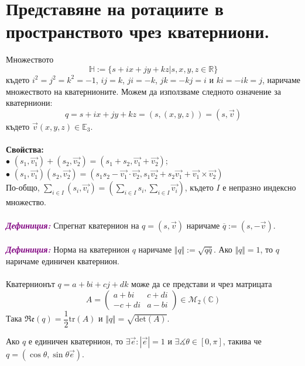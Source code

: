 \documentclass[12pt]{article}
\begin{document}
\par
\part{Представяне на ротациите в пространството чрез кватерниони.}
Множеството $$\mathbb{H}:=\{s+ix+jy+kz|s,x,y,z\in\mathbb{R}\}$$ където $i^2=j^2=k^2=-1$, $ij=k$, $ji=-k$, $jk=-kj=i$ и $ki=-ik=j$, наричаме множеството на кватернионите. Можем да използваме следното означение за кватерниони: $$q=s+ix+jy+kz=(s,(x,y,z))=(s,\vec{v})$$ където $\vec{v}(x,y,z)\in\mathbb{E}_3$.
\\
\\
\textbf{Свойства:} \\ $\bullet$ $(s_1,\overrightarrow{v_1})+(s_2,\overrightarrow{v_2})=(s_1+s_2,\overrightarrow{v_1}+\overrightarrow{v_2})$; \\
$\bullet$ $(s_1,\overrightarrow{v_1})(s_2,\overrightarrow{v_2})=(s_1s_2-\overrightarrow{v_1}\cdot\overrightarrow{v_2}, s_1\overrightarrow{v_2}+s_2\overrightarrow{v_1}+\overrightarrow{v_1}\times\overrightarrow{v_2})$
\\
По-общо, $\displaystyle\sum _{i\in I}(s_i,\overrightarrow{v_i})=\left(\displaystyle\sum _{i\in I} s_i,\displaystyle\sum _{i\in I}\overrightarrow{v_i}\right)$, където $I$ е непразно индексно множество.
\\
\\
\textbf{\textit{\textcolor{purple}{Дефиниция:}}} Спрегнат кватернион на $q=(s,\vec{v})$ наричаме $\overline{q}:=(s,-\vec{v})$.
\\
\\
\textbf{\textit{\textcolor{purple}{Дефиниция:}}} Норма на кватернион $q$ наричаме $\Vert q\Vert:=\sqrt{q\overline{q}}$. Ако $\Vert q\Vert=1$, то $q$ наричаме единичен кватернион.
\\
\\
Кватернионът $q=a+bi+cj+dk$ може да се представи и чрез матрицата $$A=\begin{pmatrix} a+bi & c+di \\ -c+di & a-bi\end{pmatrix}\in \mathcal M_2(\mathbb{C})$$
Така $\mathfrak{Re}(q)=\dfrac{1}{2}\mathrm{tr}(A) $ и $\Vert q\Vert=\sqrt{\mathrm{det}(A)}$.\\
\begin{tcolorbox}[
    colback=blue!5,    %
    colframe=blue!75!black, %
    title={\textbf{Твърдение 29:}}, %
    fonttitle=\bfseries,
    boxrule=0.8pt,
    arc=1mm,           %
    top=2mm, bottom=2mm, left=3mm, right=3mm
] Ако $q$ е единичен кватернион, то $\exists \vec{e}:|\vec{e}|=1$ и $\exists \measuredangle\theta\in[0,\pi]$, такива че $q=(\cos\theta,\sin\theta \vec{e})$.
\end{tcolorbox}
\end{document}
